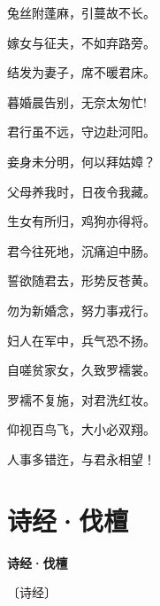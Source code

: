 \documentclass[12pt,UTF-8,openany,fontset=none]{ctexbook}
\begin{document}
\begin{center}
    \begin{Large}

        兔丝附蓬麻，引蔓故不长。

        嫁女与征夫，不如弃路旁。

        结发为妻子，席不暖君床。

        暮婚晨告别，无奈太匆忙!

        君行虽不远，守边赴河阳。

        妾身未分明，何以拜姑嫜？

        父母养我时，日夜令我藏。

        生女有所归，鸡狗亦得将。

        君今往死地，沉痛迫中肠。

        誓欲随君去，形势反苍黄。

        勿为新婚念，努力事戎行。

        妇人在军中，兵气恐不扬。

        自嗟贫家女，久致罗襦裳。

        罗襦不复施，对君洗红妆。

        仰视百鸟飞，大小必双翔。

        人事多错迕，与君永相望！

    \end{Large}

\end{center}

\vspace{8pt}
\clearpage

\section{诗经·伐檀}


\begin{center}
    {\bfseries 诗经·伐檀}

    \vspace{18pt}

    \begin{large}\xuwen
        〔诗经〕
    \end{large}

\end{center}

    \vspace{18pt}  %
\end{document}

